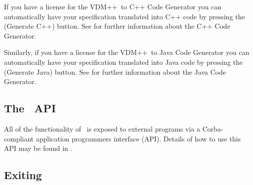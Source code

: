 \documentclass[\pformat,12pt]{article}
\newcommand{\vdmslpp}{VDM++}
\newcommand{\guicmd}[1]{{\sf #1}}
\begin{document}
If you have a license  for the \vdmslpp\ to C++
Code Generator you can automatically have your specification
translated into C++ code by pressing the 
(\guicmd{Generate C++}) button. See
 for further
information about the C++ Code Generator.




Similarly, if you have a license  for the \vdmslpp\ to Java
Code Generator you can automatically have your specification
translated into Java code by pressing the 
(\guicmd{Generate Java}) button. See
\cite{CGJavaManPP-SCSK} for further information about the Java Code
Generator.




\subsection{The \protect\VDMTools\ API}

All of the functionality of \VDMTools\ is exposed to external programs
via a Corba-compliant application programmers interface (API). Details
of how to use this API may be found in \cite{APIMan-SCSK}.




\subsection{Exiting \protect\VDMTools}
\end{document}
